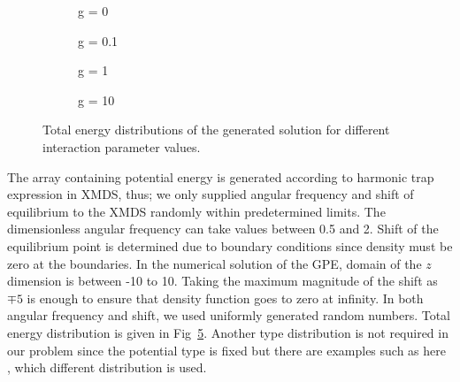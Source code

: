 \documentclass[a4paper,times,12pt]{article}
\begin{document}
\begin{figure}[H]
    \centering
    \begin{subfigure}[t]{0.45\textwidth}
        
        \caption{g = 0}
		\label{fig:a}
    \end{subfigure}
    \begin{subfigure}[t]{0.45\textwidth}
        
        \caption{g = 0.1}
		\label{fig:b}
    \end{subfigure}
    \begin{subfigure}[t]{0.45\textwidth}
        
        \caption{g = 1}
		\label{fig:c}
    \end{subfigure}
    \begin{subfigure}[t]{0.45\textwidth}
        
        \caption{g = 10}
		\label{fig:d}
    \end{subfigure}
    \caption{Total energy distributions of the generated solution for different interaction parameter values.}
\label{fig:energy_dist}
\end{figure}


The array containing potential energy is generated according to harmonic trap expression in XMDS, thus; we only supplied angular frequency and shift of equilibrium to the XMDS randomly within predetermined limits. The dimensionless angular frequency can take values between 0.5 and 2. Shift of the equilibrium point is determined due to boundary conditions since density must be zero at the boundaries. In the numerical solution of the GPE, domain of the $z$ dimension is between -10 to 10. Taking the maximum magnitude of the shift as $\mp 5$ is enough to ensure that density function goes to zero at infinity. In both angular frequency and shift, we used uniformly generated random numbers. Total energy distribution is given in Fig~\ref{fig:energy_dist}. Another type distribution is not required in our problem since the potential type is fixed but there are examples such as here \cite{mills2017deep}, which different distribution is used.

\end{document}
